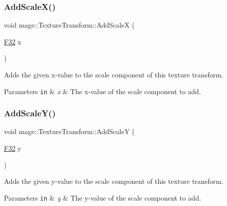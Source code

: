 \subsubsection{\texorpdfstring{Add\+Scale\+X()}{AddScaleX()}}
{\footnotesize\ttfamily void mage\+::\+Texture\+Transform\+::\+Add\+ScaleX (\begin{DoxyParamCaption}\item[{\mbox{\hyperlink{namespacemage_aa97e833b45f06d60a0a9c4fc22ae02c0}{F32}}}]{x }\end{DoxyParamCaption})\hspace{0.3cm}{\ttfamily [noexcept]}}

Adds the given x-\/value to the scale component of this texture transform.


\begin{DoxyParams}[1]{Parameters}
\mbox{\tt in}  & {\em x} & The x-\/value of the scale component to add. \\
\hline
\end{DoxyParams}
\mbox{\label{classmage_1_1_texture_transform_a48d0a0ebd014f3fd3d8f30c750763273}} 
\subsubsection{\texorpdfstring{Add\+Scale\+Y()}{AddScaleY()}}
{\footnotesize\ttfamily void mage\+::\+Texture\+Transform\+::\+Add\+ScaleY (\begin{DoxyParamCaption}\item[{\mbox{\hyperlink{namespacemage_aa97e833b45f06d60a0a9c4fc22ae02c0}{F32}}}]{y }\end{DoxyParamCaption})\hspace{0.3cm}{\ttfamily [noexcept]}}

Adds the given y-\/value to the scale component of this texture transform.


\begin{DoxyParams}[1]{Parameters}
\mbox{\tt in}  & {\em y} & The y-\/value of the scale component to add. \\
\hline
\end{DoxyParams}
\mbox{\label{classmage_1_1_texture_transform_a759b5363ddc7621b422ebdc90c9e17af}} 

